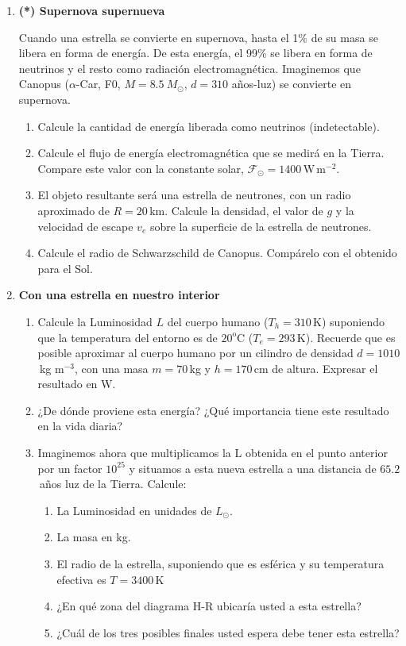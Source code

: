 \documentclass[a4paper,12pt]{article}
\begin{document}
\begin{enumerate}
\item{\bf{(*) Supernova supernueva}}

Cuando una estrella se convierte en supernova, hasta el 1\% de su masa se
libera en forma de energía. De esta energía, el 99\% se libera en forma de
neutrinos y el resto como radiación electromagnética. Imaginemos que Canopus
($\alpha$-Car, F0, $M=8.5\ M_\odot$, $d=310$ años-luz) se convierte en
supernova.
\begin{enumerate}
\item Calcule la cantidad de energía liberada como neutrinos (indetectable).
\item Calcule el flujo de energía electromagnética que se medirá en la Tierra.
Compare este valor con la constante solar,
$\mathcal{F}_\odot=1400$\,W\,m$^{-2}$.
\item El objeto resultante será una estrella de neutrones, con un radio
aproximado de $R=20$\,km. Calcule la densidad, el valor de $g$ y la velocidad
de escape $v_e$ sobre la superficie de la estrella de neutrones.
\item Calcule el radio de Schwarzschild de Canopus. Compárelo con el obtenido
para el Sol.
\end{enumerate}

\item{\bf{Con una estrella en nuestro interior}}

\begin{enumerate}
\item Calcule la Luminosidad $L$ del cuerpo humano ($T_h = 310$\,K) suponiendo que la temperatura del entorno es de $20^\mathrm{o}$C ($T_e=293$\,K). Recuerde que es posible aproximar al cuerpo humano por un cilindro de densidad $d=1010$\,kg m$^{-3}$, con una masa $m=70$\,kg y $h=170$\,cm de altura. Expresar el resultado en W. 
\item ¿De dónde proviene esta energía? ¿Qué importancia tiene este resultado en la vida diaria?
\item Imaginemos ahora que multiplicamos la L obtenida en el punto anterior por un factor $10^{25}$ y situamos a esta nueva estrella a una distancia de $65.2$\,años luz de la Tierra. Calcule:
\begin{enumerate}
\item La Luminosidad en unidades de $L_\odot$.
\item La masa en kg.
\item El radio de la estrella, suponiendo que es esférica y su temperatura efectiva es $T=3400$\,K 
\item ¿En qué zona del diagrama H-R ubicaría usted a esta estrella?
\item ¿Cuál de los tres posibles finales usted espera debe tener
esta estrella? 
\end{enumerate}
\end{enumerate}


\end{enumerate}
\end{document}
